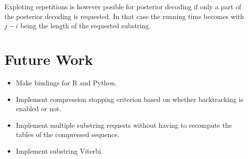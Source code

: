 Exploting repetitions is however posible for posterior decoding if only a
part of the posterior decoding is requested. In that case the running time
becomes  with $j - i$ being the length of the
requested substring.

\section{Future Work}

\begin{itemize}
\item Make bindings for R and Python.
\item Implement compression stopping criterion based on whether backtracking is
  enabled or not.
\item Implement multiple substring requests without having to recompute the
  tables of the compressed sequence.
\item Implement substring Viterbi.
\end{itemize}


